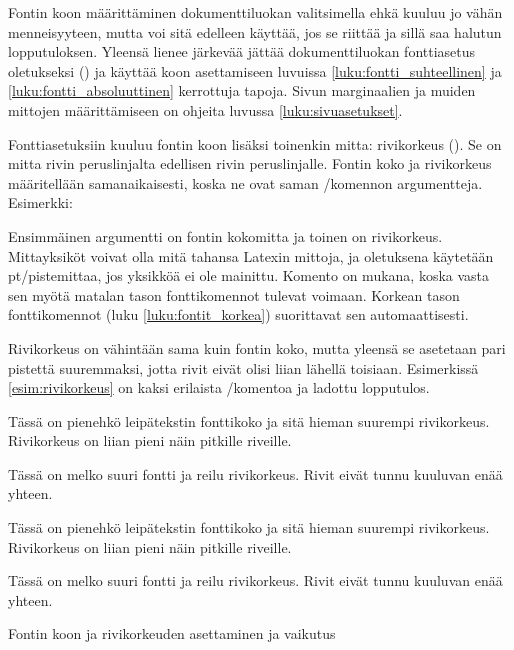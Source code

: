 Fontin koon määrittäminen dokumenttiluokan valitsimella ehkä kuuluu jo
vähän menneisyyteen, mutta voi sitä edelleen käyttää, jos se riittää ja
sillä saa halutun lopputuloksen. Yleensä lienee järkevää jättää
dokumenttiluokan fonttiasetus oletukseksi (\koodi{10pt}) ja käyttää koon
asettamiseen luvuissa \ref{luku:fontti_suhteellinen} ja
\ref{luku:fontti_absoluuttinen} kerrottuja tapoja. Sivun marginaalien ja
muiden mittojen määrittämiseen on ohjeita luvussa
\ref{luku:sivuasetukset}.

Fonttiasetuksiin kuuluu fontin koon lisäksi toinenkin mitta: rivikorkeus
(). Se on mitta rivin peruslinjalta edellisen
rivin peruslinjalle. Fontin koko ja rivikorkeus määritellään
saman\-aikaisesti, koska ne ovat saman \-/komennon
argumentteja. Esimerkki:

\begin{koodilohkosis}
  \fontsize{10bp}{12bp} \selectfont
\end{koodilohkosis}

Ensimmäinen argumentti on fontin kokomitta ja toinen on rivikorkeus.
Mitta\-yksiköt voivat olla mitä tahansa Latexin mittoja, ja oletuksena
käytetään pt\-/pistemittaa, jos yksikköä ei ole mainittu. Komento
 on mukana, koska vasta sen myötä matalan tason
fonttikomennot tulevat voimaan. Korkean tason fonttikomennot (luku
\ref{luku:fontit_korkea}) suorittavat sen automaattisesti.

Rivikorkeus on vähintään sama kuin fontin koko, mutta yleensä se
asetetaan pari pistettä suuremmaksi, jotta rivit eivät olisi liian
lähellä toisiaan. Esimerkissä \ref{esim:rivikorkeus} on kaksi erilaista
\-/komentoa ja ladottu lopputulos.

\begin{esimerkki}
\begin{koodilohko}
  \fontsize{10bp}{12bp}\selectfont Tässä on pienehkö leipätekstin
  fonttikoko ja sitä hieman suurempi rivikorkeus. Rivikorkeus on
  liian pieni näin pitkille riveille.

  \fontsize{16bp}{25bp}\selectfont Tässä on melko suuri fontti ja
  reilu rivikorkeus. Rivit eivät tunnu kuuluvan enää yhteen.
\end{koodilohko}
\parbox{\linewidth}{%
  \linespread{1}
  \fontsize{10bp}{12bp}\selectfont Tässä on pienehkö leipätekstin
  fonttikoko ja sitä hieman suurempi rivikorkeus. Rivikorkeus on liian
  pieni näin pitkille riveille.

  \fontsize{16bp}{25bp}\selectfont Tässä on melko suuri fontti ja reilu
  rivikorkeus. Rivit eivät tunnu kuuluvan enää yhteen. }

\vspace{1ex}
\hrulefill
\vspace{2ex}

\caption{Fontin koon ja rivikorkeuden asettaminen ja vaikutus}
\label{esim:rivikorkeus}
\end{esimerkki}

